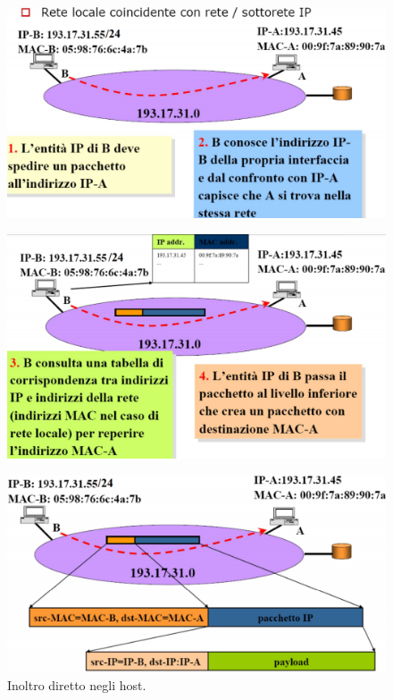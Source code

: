 \documentclass[11pt,a4paper,oneside]{book}
\theoremstyle{definition}
\begin{document}
\pagebreak

\begin{figure}[!h]
	\includegraphics[scale=0.28]{Immagini/Ip_dir.png}
	\centering
\end{figure}\begin{figure}[!h]
	\includegraphics[scale=0.28]{Immagini/Ip_dir1.png}
	\centering
\end{figure}\begin{figure}[!h]
	\includegraphics[scale=0.28]{Immagini/Ip_dir2.png}
	\centering
	\caption{Inoltro diretto negli host.}
\end{figure}
\end{document}
